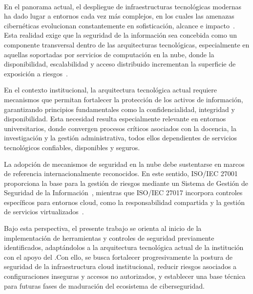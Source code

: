 \label{cap:introduccion}
\mbox{}\\

En el panorama actual, el despliegue de infraestructuras tecnológicas modernas ha dado lugar a entornos cada vez más complejos, en 
los cuales las amenazas cibernéticas evolucionan constantemente en sofisticación, alcance e impacto~\cite{WEF2026CybersecurityOutlook}. 
Esta realidad exige que la seguridad de la información sea concebida como un componente transversal dentro de las arquitecturas 
tecnológicas, especialmente en aquellas soportadas por servicios de computación en la nube, donde la disponibilidad, escalabilidad y 
acceso distribuido incrementan la superficie de exposición a riesgos~\cite{iso27001}.

En el contexto institucional, la arquitectura tecnológica actual requiere mecanismos que permitan fortalecer la protección de los 
activos de información, garantizando principios fundamentales como la confidencialidad, integridad y disponibilidad. Esta 
necesidad resulta especialmente relevante en entornos universitarios, donde convergen procesos críticos asociados con la docencia, 
la investigación y la gestión administrativa, todos ellos dependientes de servicios tecnológicos confiables, disponibles y seguros.

La adopción de mecanismos de seguridad en la nube debe sustentarse en marcos de referencia internacionalmente reconocidos. En este 
sentido, ISO/IEC 27001 proporciona la base para la gestión de riesgos mediante un Sistema de Gestión de Seguridad de la 
Información~\cite{iso27001}, mientras que ISO/IEC 27017 incorpora controles específicos para entornos cloud, como la responsabilidad compartida y 
la gestión de servicios virtualizados~\cite{iso27017}.

Bajo esta perspectiva, el presente trabajo se orienta al inicio de la implementación de herramientas y controles de seguridad 
previamente identificados, adaptándolos a la arquitectura tecnológica actual de la institución con el apoyo del \UTM.\@ Con ello, se 
busca fortalecer progresivamente la postura de seguridad de la infraestructura cloud institucional, reducir riesgos asociados a 
configuraciones inseguras y accesos no autorizados, y establecer una base técnica para futuras fases de maduración del ecosistema 
de ciberseguridad.